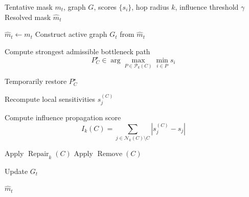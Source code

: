 \documentclass{article}
\theoremstyle{definition}
\theoremstyle{remark}
\begin{document}
\begin{algorithm}[!ht]
\caption{$k$-hop bottleneck resolution}
\label{alg:khop_sensitivity_influence_resolution}
\begin{algorithmic}[1]

\Require Tentative mask $m_t$, graph $G$, scores $\{s_i\}$, hop radius $k$, influence threshold $\gamma$
\Ensure Resolved mask $\widehat m_t$

\State $\widehat m_t \gets m_t$
\State Construct active graph $G_t$ from $\widehat m_t$



        \State Compute strongest admissible bottleneck path
        \[
        P_C^\star
        \in
        \arg\max_{P\in\mathcal P_k(C)}
        \min_{i\in P} s_i
        \]

        \State Temporarily restore $P_C^\star$

        \State Recompute local sensitivities $s_j^{(C)}$

        \State Compute influence propagation score
        \[
        I_k(C)
        =
        \sum_{j\in\mathcal N_k(C)\setminus C}
        \left|s_j^{(C)}-s_j\right|
        \]

            \State Apply $\operatorname{Repair}_k(C)$
        \Else
            \State Apply $\operatorname{Remove}(C)$
        \EndIf

    \EndFor

    \State Update $G_t$

\EndWhile

\State \Return $\widehat m_t$

\end{algorithmic}
\end{algorithm}








\end{document}
